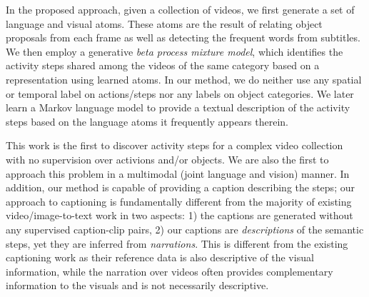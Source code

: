 
In the proposed approach, given a collection of videos, we first generate a set of language and visual atoms. These atoms are the result of relating object proposals from each frame as well as detecting the frequent words from subtitles. We then employ a generative \emph{beta process mixture model}, which identifies the activity steps shared among the videos of the same category based on a representation using learned atoms. In our method, we do neither use any spatial or temporal label on actions/steps nor any labels on object categories. We later learn a Markov language model to provide a textual description of the activity steps based on the language atoms it frequently appears therein.

This work is the first to discover activity steps for a complex video collection with no supervision over activions and/or objects. We are also the first to approach this problem in a multimodal (joint language and vision) manner. In addition, our method is capable of providing a caption describing the steps; our approach to captioning is fundamentally different from the majority of existing video/image-to-text work in two aspects: 1) the captions are generated without any supervised caption-clip pairs, 2) our captions are \emph{descriptions} of the semantic steps, yet they are inferred from \emph{narrations}. This is different from the existing captioning work as their reference data is also descriptive of the visual information, while the narration over videos often provides complementary information to the visuals and is not necessarily descriptive.


